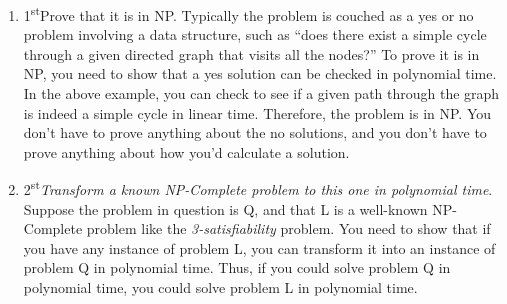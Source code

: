 \documentclass[12pt]{article}
\begin{document}
\begin{enumerate}
\item 1\textsuperscript{st}Prove that it is in NP.  Typically the problem is couched as
a {\Large yes} or {\Large no} problem involving a data structure, such 
as ``does there exist a simple cycle through a
given directed graph that visits all the nodes?''  
To prove it is in NP, you need to show that 
a {\Large yes} solution can be checked in polynomial time.  
In the above example, you can check to see if a given path through the graph
is indeed a simple cycle in linear time.  Therefore, the problem is in 
{\Large NP}.  You don't have to prove anything about the {\Large no} solutions,
and you don't have to prove anything about how you'd calculate a solution.

\item 2\textsuperscript{st}\textit{Transform a known NP-Complete problem to this one in polynomial time}.  
Suppose the problem in question is {\Large Q},
and that {\Large L} is a well-known NP-Complete problem like 
the \textit{3-satisfiability} problem.  You need to show that if you have
any instance of problem {\Large L}, you can transform it into an instance
of problem {\Large Q} in polynomial time.  Thus, if you could solve problem
{\Large Q} in polynomial time, you could solve problem {\Large L} in polynomial
time. 

\end{enumerate}
\end{document}
